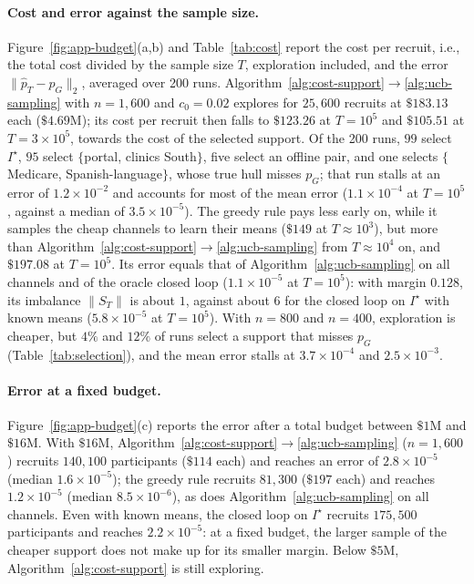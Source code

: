 \documentclass[twoside]{article}
\begin{document}
\paragraph{Cost and error against the sample size.}
Figure~\ref{fig:app-budget}(a,b) and Table~\ref{tab:cost} report the cost
per recruit, i.e., the total cost divided by the sample size \(T\),
exploration included, and the error \(\|\widehat p_T-p_G\|_2\), averaged
over 200 runs. Algorithm~\ref{alg:cost-support}\(\to\)\ref{alg:ucb-sampling}
with \(n=1{,}600\) and \(c_0=0.02\) explores for \(25{,}600\) recruits at
\(\$183.13\) each (\(\$4.69\)M); its cost per recruit then falls to
\(\$123.26\) at \(T=10^5\) and \(\$105.51\) at \(T=3\times10^5\), towards
the cost of the selected support. Of the 200 runs, \(99\) select \(I^\star\),
\(95\) select \(\{\)portal, clinics South\(\}\), five select an offline pair,
and one selects \(\{\)Medicare, Spanish-language\(\}\), whose true hull
misses \(p_G\); that run stalls at an error of \(1.2\times10^{-2}\) and
accounts for most of the mean error (\(1.1\times10^{-4}\) at \(T=10^5\),
against a median of \(3.5\times10^{-5}\)). The greedy rule pays less early
on, while it samples the cheap channels to learn their means (\(\$149\) at
\(T\approx10^3\)), but more than
Algorithm~\ref{alg:cost-support}\(\to\)\ref{alg:ucb-sampling} from
\(T\approx10^4\) on, and \(\$197.08\) at \(T=10^5\). Its error equals that
of Algorithm~\ref{alg:ucb-sampling} on all channels and of the oracle closed
loop (\(1.1\times10^{-5}\) at \(T=10^5\)): with margin \(0.128\), its
imbalance \(\|S_T\|\) is about \(1\), against about \(6\) for the closed loop
on \(I^\star\) with known means (\(5.8\times10^{-5}\) at \(T=10^5\)). With
\(n=800\) and \(n=400\), exploration is cheaper, but \(4\%\) and \(12\%\) of
runs select a support that misses \(p_G\)
(Table~\ref{tab:selection}), and the mean error stalls at
\(3.7\times10^{-4}\) and \(2.5\times10^{-3}\).

\paragraph{Error at a fixed budget.} Figure~\ref{fig:app-budget}(c) reports
the error after a total budget between \(\$1\)M and \(\$16\)M. With
\(\$16\)M, Algorithm~\ref{alg:cost-support}\(\to\)\ref{alg:ucb-sampling}
(\(n=1{,}600\)) recruits \(140{,}100\) participants (\(\$114\) each) and
reaches an error of \(2.8\times10^{-5}\) (median \(1.6\times10^{-5}\)); the
greedy rule recruits \(81{,}300\) (\(\$197\) each) and reaches
\(1.2\times10^{-5}\) (median \(8.5\times10^{-6}\)), as does
Algorithm~\ref{alg:ucb-sampling} on all channels. Even with known means, the
closed loop on \(I^\star\) recruits \(175{,}500\) participants and reaches
\(2.2\times10^{-5}\): at a fixed budget, the larger sample of the cheaper
support does not make up for its smaller margin. Below \(\$5\)M,
Algorithm~\ref{alg:cost-support} is still exploring.
\end{document}
